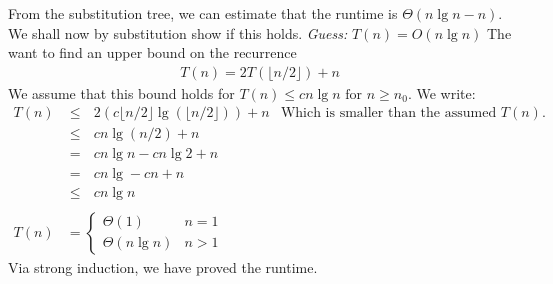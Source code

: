 From the substitution tree, we can estimate that the runtime is
$\Theta(n\lg n-n)$. We shall now by substitution show if this holds.
\newline\newline
\textit{Guess:} $T(n)=O(n\lg n)$
\newline\newline
The want to find an upper bound on the recurrence
\begin{align*}
  T(n)=2T(\lfloor n/2\rfloor)+n
\end{align*}
We assume that this bound holds for $T(n)\leq cn\lg n\textrm{ for }n\geq n_0$.
We write:
\begin{align*}
  T(n)&\leq\textrm{ }2(c\lfloor n/2\rfloor\lg(\lfloor n/2\rfloor))+n&
  \textrm{Which is smaller than the assumed }T(n)\textrm{.}\\
  &\leq\textrm{ }cn\lg(n/2)+n\\
  &=\textrm{ }cn\lg n-cn\lg2+n\\
  &=\textrm{ }cn\lg-cn+n\\
  &\leq\textrm{ }cn\lg n\\\\
  T(n)&=
  \begin{cases}
    \Theta(1)&n=1\\
    \Theta(n\lg n)&n>1
  \end{cases}
\end{align*}
Via strong induction, we have proved the runtime.\newline\newline
{}

